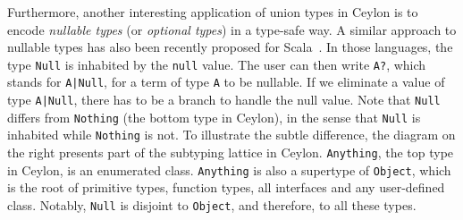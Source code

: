 Furthermore, another interesting application of union types in Ceylon is to
encode \textit{nullable types} (or \textit{optional types}) in a type-safe way.
A similar approach to nullable types has also been recently proposed for
Scala~\citep{nieto20nulls}. In those languages, the type \lstinline{Null} is
inhabited by the \lstinline{null} value. The user can then write \lstinline{A?},
which stands for \lstinline{A|Null}, for a term of type \lstinline{A} to be
nullable. If we eliminate a value of type \lstinline{A|Null}, there has to be a
branch to handle the null value. Note that \lstinline{Null} differs from
\lstinline{Nothing} (the bottom type in Ceylon), in the sense that
\lstinline{Null} is inhabited while \lstinline{Nothing} is not. To illustrate
the subtle difference, the diagram on the right presents part of the subtyping
lattice in Ceylon. \lstinline{Anything}, the top type in Ceylon, is an
enumerated class. \lstinline{Anything} is also a supertype of
\lstinline{Object}, which is the root of primitive types, function types, all
interfaces and any user-defined class. Notably, \lstinline{Null} is disjoint to
\lstinline{Object}, and therefore, to all these types.




